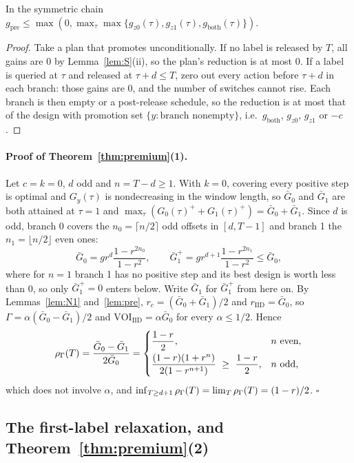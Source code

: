\begin{lemma}
\label{lem:pre}
In the symmetric chain $g_{\mathrm{pre}}\le\max(0,\max_\tau\max\{g_{z0}(\tau),g_{z1}(\tau),g_{\mathrm{both}}(\tau)\})$.
\end{lemma}

\begin{proof}
Take a plan that promotes unconditionally. If no label is released by $T$, all gains are 0 by Lemma~\ref{lem:S}(ii), so the plan's reduction is at most 0. If a label is queried at $\tau$ and released at $\tau+d\le T$, zero out every action before $\tau+d$ in each branch: those gains are 0, and the number of switches cannot rise. Each branch is then empty or a post-release schedule, so the reduction is at most that of the design with promotion set $\{y:\text{branch nonempty}\}$, i.e.\ $g_{\mathrm{both}}$, $g_{z0}$, $g_{z1}$ or $-c$.
\end{proof}

\paragraph{Proof of Theorem~\ref{thm:premium}(1).} Let $c=k=0$, $d$ odd and $n=T-d\ge1$. With $k=0$, covering every positive step is optimal and $G_y(\tau)$ is nondecreasing in the window length, so $\bar G_0$ and $\bar G_1$ are both attained at $\tau=1$ and $\max_\tau(G_0(\tau)^++G_1(\tau)^+)=\bar G_0+\bar G_1$. Since $d$ is odd, branch 0 covers the $n_0=\lceil n/2\rceil$ odd offsets in $[d,T-1]$ and branch 1 the $n_1=\lfloor n/2\rfloor$ even ones:
\[
\bar G_0=gr^d\frac{1-r^{2n_0}}{1-r^2},\qquad \bar G_1^+=gr^{d+1}\frac{1-r^{2n_1}}{1-r^2}\le\bar G_0,
\]
where for $n=1$ branch 1 has no positive step and its best design is worth less than 0, so only $\bar G_1^+=0$ enters below. Write $\bar G_1$ for $\bar G_1^+$ from here on.
By Lemmas~\ref{lem:N1} and~\ref{lem:pre}, $r_c=(\bar G_0+\bar G_1)/2$ and $r_{\mathrm{IID}}=\bar G_0$, so $\Gamma=\alpha(\bar G_0-\bar G_1)/2$ and $\mathrm{VOI}_{\mathrm{IID}}=\alpha\bar G_0$ for every $\alpha\le1/2$. Hence
\[
\rho_\Gamma(T)=\frac{\bar G_0-\bar G_1}{2\bar G_0}=
\begin{cases}\dfrac{1-r}{2}, & n\text{ even},\\[2mm]
\dfrac{(1-r)(1+r^n)}{2(1-r^{n+1})}\ \ge\ \dfrac{1-r}{2}, & n\text{ odd},\end{cases}
\]
which does not involve $\alpha$, and $\inf_{T\ge d+1}\rho_\Gamma(T)=\lim_T\rho_\Gamma(T)=(1-r)/2$. \hfill$\square$

\subsection{The first-label relaxation, and Theorem~\ref{thm:premium}(2)}


